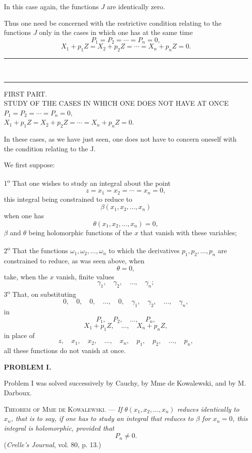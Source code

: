 \documentclass[11pt]{article}
\newcommand{\ornament}{\begin{center}\rule{2.5em}{0.4pt}\,\raisebox{0.1ex}{\tiny$\bullet\bullet\bullet$}\,\rule{2.5em}{0.4pt}\end{center}}
\begin{document}
In this case again, the functions $J$ are identically zero.

Thus one need be concerned with the restrictive condition relating to the functions $J$ only in the cases in which one has at the same time
\[
P_1=P_2=\cdots=P_n=0,
\]
\[
X_1+p_1Z=X_2+p_2Z=\cdots=X_n+p_nZ=0.
\]

\ornament

\begin{center}
{\Large FIRST PART.}\\[0.8em]
{\small STUDY OF THE CASES IN WHICH ONE DOES NOT HAVE AT ONCE}\\[0.6em]
$P_1=P_2=\cdots=P_n=0,$\\[0.35em]
$X_1+p_1Z=X_2+p_2Z=\cdots=X_n+p_nZ=0.$
\end{center}

In these cases, as we have just seen, one does not have to concern oneself with the condition relating to the J.

We first suppose:

1\textsuperscript{o} That one wishes to study an integral about the point
\[
z=x_1=x_2=\cdots=x_n=0,
\]
this integral being constrained to reduce to
\[
\beta(x_1,x_2,\ldots,x_n)
\]
when one has
\[
\theta(x_1,x_2,\ldots,x_n)=0,
\]
$\beta$ and $\theta$ being holomorphic functions of the $x$ that vanish with these variables;

2\textsuperscript{o} That the functions $\omega_1,\omega_2,\ldots,\omega_n$ to which the derivatives $p_1,p_2,\ldots,p_n$ are constrained to reduce, as was seen above, when
\[
\theta=0,
\]
take, when the $x$ vanish, finite values
\[
\gamma_1,\quad \gamma_2,\quad \ldots,\quad \gamma_n;
\]
3\textsuperscript{o} That, on substituting
\[
0,\quad 0,\quad 0,\quad \ldots,\quad 0,\quad \gamma_1,\quad \gamma_2,\quad \ldots,\quad \gamma_n,
\]
in
\[
P_1,\quad P_2,\quad \ldots,\quad P_n,
\]
\[
X_1+p_1Z,\quad \ldots,\quad X_n+p_nZ,
\]
in place of
\[
z,\quad x_1,\quad x_2,\quad \ldots,\quad x_n,\quad p_1,\quad p_2,\quad \ldots,\quad p_n,
\]
all these functions do not vanish at once.

\begin{center}
\textbf{PROBLEM I.}
\end{center}

Problem I was solved successively by Cauchy, by Mme de Kowalewski, and by M. Darboux.

\medskip
\noindent\textsc{Theorem of Mme de Kowalewski.} — \emph{If $\theta(x_1,x_2,\ldots,x_n)$ reduces identically to $x_n$, that is to say, if one has to study an integral that reduces to $\beta$ for $x_n=0$, this integral is holomorphic, provided that}
\[
P_n\ne0.
\]
(\emph{Crelle's Journal}, vol. 80, p. 13.)
\end{document}
